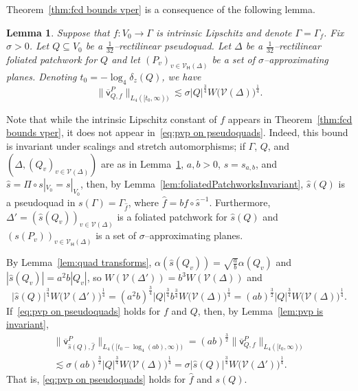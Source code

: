 \documentclass[11pt,reqno]{amsart}
\newcommand{\cV}{\mathcal{V}}
\newcommand{\0}{\mathbf{0}}
\renewcommand{\1}{\mathbf 1}
\newcommand{\from}{\colon}
\renewcommand{\subset}{\subseteq}
\newtheorem{lemma}[thm]{Lemma}
\theoremstyle{remark}
\newcommand{\vpP}[1]{{\overline{\mathsf{v}}^{P}_{\!#1}}}
\newcommand{\cVh}{{\mathcal{V}_{\mathsf{H}}}}
\begin{document}
Theorem~\ref{thm:fcd bounds vper} is a consequence of the following lemma.
\begin{lemma}\label{lem:pvp on pseudoquads} Suppose that $f\from V_0\to \Gamma$ is intrinsic Lipschitz and denote $\Gamma=\Gamma_f$.  Fix $\sigma>0$.  Let $Q\subset V_0$ be a $\frac{1}{32}$--rectilinear pseudoquad.  Let $\Delta$ be a $\frac{1}{32}$--rectilinear foliated patchwork for $Q$ and let $(P_v)_{v\in \cVh(\Delta)}$ be a set of $\sigma$--approximating planes.  Denoting $t_0=-\log_4 \delta_z(Q)$, we have
  \begin{equation}\label{eq:pvp on pseudoquads}
    \big\|\vpP{Q,f}\big\|_{L_4([t_0,\infty))}\lesssim \sigma |Q|^{\frac{3}{4}}W\big(\cV(\Delta)\big)^{\frac{1}{4}}.
  \end{equation}
\end{lemma}
Note that while the intrinsic Lipschitz constant of $f$ appears in Theorem~\ref{thm:fcd bounds vper}, it does not appear in~\eqref{eq:pvp on pseudoquads}.  Indeed, this bound is invariant under scalings and stretch automorphisms; if $\Gamma$, $Q$, and $(\Delta,(Q_v)_{v\in \cV(\Delta)})$ are as in Lemma~\ref{lem:pvp on pseudoquads}, $a, b>0$, $s=s_{a,b}$, and $\hat{s}=\Pi\circ s|_{V_0}=s|_{V_0}$, then, by Lemma~\ref{lem:foliatedPatchworksInvariant}, $\hat{s}(Q)$ is a  pseudoquad in $s(\Gamma)=\Gamma_{\hat{f}}$, where $\hat{f}=b f\circ \hat{s}^{-1}$. Furthermore, $\Delta'=(\hat{s}(Q_v))_{v\in \cV(\Delta)}$ is a foliated patchwork for $\hat{s}(Q)$ and $(s(P_v))_{v\in \cVh(\Delta)}$ is a set of $\sigma$--approximating planes.

By Lemma~\ref{lem:quad transforms}, $\alpha(\hat{s}(Q_v))=\sqrt{\frac{a}{b}}\alpha(Q_v)$ and $|\hat{s}(Q_v)|=a^2b|Q_v|$, so $W(\cV(\Delta'))=b^{3}W(\cV(\Delta))$ and
$$|\hat{s}(Q)|^{\frac{3}{4}}W\big(\cV(\Delta')\big)^{\frac{1}{4}}=(a^2b)^{\frac{3}{4}}|Q|^{\frac{3}{4}}b^{\frac{3}{4}} W\big(\cV(\Delta)\big)^{\frac{1}{4}}=(ab)^{\frac{3}{2}}|Q|^{\frac{3}{4}} W\big(\cV(\Delta)\big)^{\frac{1}{4}}.$$
If~\eqref{eq:pvp on pseudoquads} holds for $f$ and $Q$, then, by Lemma~\ref{lem:pvp is invariant},
\begin{multline*}
  \big\|\vpP{\hat{s}(Q),\hat{f}}\big\|_{L_4([t_0-\log_4(ab),\infty))}=(ab)^{\frac{3}{2}}\big\|\vpP{Q,f}\big\|_{L_4([t_0,\infty))} \\
  \lesssim \sigma (ab)^{\frac{3}{2}} |Q|^{\frac{3}{4}} W\big(\cV(\Delta)\big)^{\frac{1}{4}} = \sigma |\hat{s}(Q)|^{\frac{3}{4}}W\big(\cV(\Delta')\big)^{\frac{1}{4}}.
\end{multline*}
That is, \eqref{eq:pvp on pseudoquads} holds for $\hat{f}$ and $s(Q)$.
\end{document}

